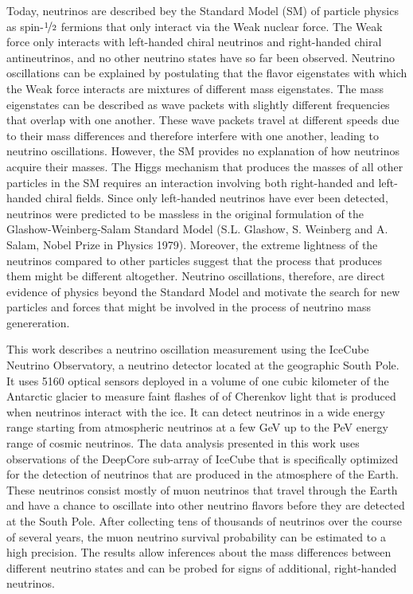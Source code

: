 Today, neutrinos are described bey the Standard Model (SM) of particle physics as spin-$\nicefrac{1}{2}$ fermions that only interact via the Weak nuclear force. The Weak force only interacts with left-handed chiral neutrinos and right-handed chiral antineutrinos, and no other neutrino states have so far been observed. Neutrino oscillations can be explained by postulating that the flavor eigenstates with which the Weak force interacts are mixtures of different mass eigenstates. The mass eigenstates can be described as wave packets with slightly different frequencies that overlap with one another. These wave packets travel at different speeds due to their mass differences and therefore interfere with one another, leading to neutrino oscillations. However, the SM provides no explanation of how neutrinos acquire their masses. The Higgs mechanism that produces the masses of all other particles in the SM requires an interaction involving both right-handed and left-handed chiral fields. Since only left-handed neutrinos have ever been detected, neutrinos were predicted to be massless in the original formulation of the Glashow-Weinberg-Salam Standard Model (S.L. Glashow, S. Weinberg and A. Salam, Nobel Prize in Physics 1979). Moreover, the extreme lightness of the neutrinos compared to other particles suggest that the process that produces them might be different altogether. Neutrino oscillations, therefore, are direct evidence of physics beyond the Standard Model and motivate the search for new particles and forces that might be involved in the process of neutrino mass genereration.

This work describes a neutrino oscillation measurement using the IceCube Neutrino Observatory, a neutrino detector located at the geographic South Pole. It uses 5160 optical sensors deployed in a volume of one cubic kilometer of the Antarctic glacier to measure faint flashes of of Cherenkov light that is produced when neutrinos interact with the ice. It can detect neutrinos in a wide energy range starting from atmospheric neutrinos at a few GeV up to the PeV energy range of cosmic neutrinos. The data analysis presented in this work uses observations of the DeepCore sub-array of IceCube that is specifically optimized for the detection of neutrinos that are produced in the atmosphere of the Earth. These neutrinos consist mostly of muon neutrinos that travel through the Earth and have a chance to oscillate into other neutrino flavors before they are detected at the South Pole. After collecting tens of thousands of neutrinos over the course of several years, the muon neutrino survival probability can be estimated to a high precision. The results allow inferences about the mass differences between different neutrino states and can be probed for signs of additional, right-handed neutrinos.

